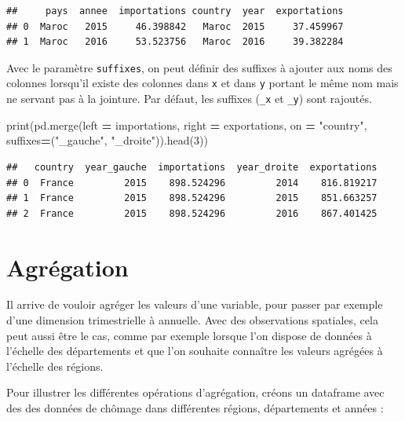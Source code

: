 \documentclass[
  12pt,
]{book}
\newenvironment{Shaded}{\begin{snugshade}}{\end{snugshade}}
\newcommand{\BuiltInTok}[1]{#1}
\newcommand{\DecValTok}[1]{\textcolor[rgb]{0.00,0.00,0.81}{#1}}
\newcommand{\NormalTok}[1]{#1}
\newcommand{\OperatorTok}[1]{\textcolor[rgb]{0.81,0.36,0.00}{\textbf{#1}}}
\newcommand{\StringTok}[1]{\textcolor[rgb]{0.31,0.60,0.02}{#1}}
\numberwithin{equation}{section}
\numberwithin{countremarque}{section}
\begin{document}
\begin{lstlisting}
##     pays  annee  importations country  year  exportations
## 0  Maroc   2015     46.398842   Maroc  2015     37.459967
## 1  Maroc   2016     53.523756   Maroc  2016     39.382284
\end{lstlisting}

Avec le paramètre \texttt{suffixes}, on peut définir des suffixes à ajouter aux noms des colonnes lorsqu'il existe des colonnes dans \texttt{x} et dans \texttt{y} portant le même nom mais ne servant pas à la jointure. Par défaut, les suffixes (\texttt{\_x} et \texttt{\_y}) sont rajoutés.

\begin{Shaded}
\begin{Highlighting}[]
\BuiltInTok{print}\NormalTok{(pd.merge(left }\OperatorTok{=}\NormalTok{ importations, right }\OperatorTok{=}\NormalTok{ exportations,}
\NormalTok{               on }\OperatorTok{=} \StringTok{"country"}\NormalTok{,}
\NormalTok{               suffixes}\OperatorTok{=}\NormalTok{(}\StringTok{"\_gauche"}\NormalTok{, }\StringTok{"\_droite"}\NormalTok{)).head(}\DecValTok{3}\NormalTok{))}
\end{Highlighting}
\end{Shaded}

\begin{lstlisting}
##   country  year_gauche  importations  year_droite  exportations
## 0  France         2015    898.524296         2014    816.819217
## 1  France         2015    898.524296         2015    851.663257
## 2  France         2015    898.524296         2016    867.401425
\end{lstlisting}

\section{Agrégation}\label{agruxe9gation}

Il arrive de vouloir agréger les valeurs d'une variable, pour passer par exemple d'une dimension
trimestrielle à annuelle. Avec des observations spatiales, cela peut aussi être le cas, comme
par exemple lorsque l'on dispose de données à l'échelle des départements et que l'on souhaite
connaître les valeurs agrégées à l'échelle des régions.

Pour illustrer les différentes opérations d'agrégation, créons un dataframe avec des des données de chômage dans différentes régions, départements et années :
\end{document}

